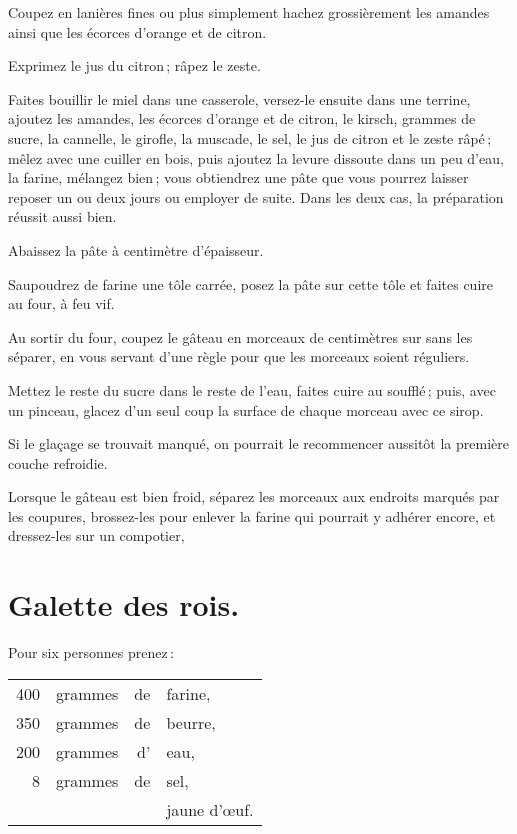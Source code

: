 Coupez en lanières fines ou plus simplement hachez grossièrement les amandes
ainsi que les écorces d'orange et de citron.

Exprimez le jus du citron ; râpez le zeste.

Faites bouillir le miel dans une casserole, versez-le ensuite dans une terrine,
ajoutez les amandes, les écorces d'orange et de citron, le kirsch,
{\mmm} grammes de sucre, la cannelle, le girofle, la muscade, le sel, le
jus de citron et le zeste râpé ; mêlez avec une cuiller en bois, puis ajoutez
la levure dissoute dans un peu d'eau, la farine, mélangez bien ; vous
obtiendrez une pâte que vous pourrez laisser reposer un ou deux jours ou
employer de suite. Dans les deux cas, la préparation réussit aussi bien.

Abaissez la pâte à {\mmm} centimètre d'épaisseur.

Saupoudrez de farine une tôle carrée, posez la pâte sur cette tôle et faites
cuire au four, à feu vif.

Au sortir du four, coupez le gâteau en morceaux de {\mmm} centimètres sur
{\mmm} sans les séparer, en vous servant d'une règle pour que les morceaux
soient réguliers.

Mettez le reste du sucre dans le reste de l'eau, faites cuire au soufflé ;
puis, avec un pinceau, glacez d'un seul coup la surface de chaque morceau avec
ce sirop.

Si le glaçage se trouvait manqué, on pourrait le recommencer aussitôt la
première couche refroidie.

Lorsque le gâteau est bien froid, séparez les morceaux aux endroits marqués par
les coupures, brossez-les pour enlever la farine qui pourrait y adhérer encore,
et dressez-les sur un compotier,

\section*{\centering Galette des rois.}
{}

Pour six personnes prenez :

\footnotesize
\begin{longtable}{rrrp{16em}}
    400 & grammes & de & farine,                                                                          \\
    350 & grammes & de & beurre,                                                                          \\
    200 & grammes & d' & eau,                                                                             \\
      8 & grammes & de & sel,                                                                             \\
        &         &    & jaune d'œuf.                                                                     \\
\end{longtable}
\normalsize

